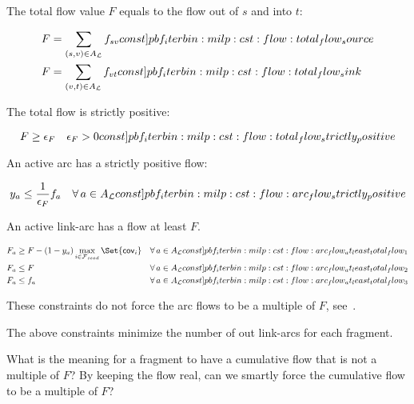 The total flow value \(F\) equals to the flow out of \(s\) and into \(t\):
\begin{Constraint}
  \begin{align}
    F & = \sum_{(s, v) \in A_\Links{}} f_{sv} \cstlabel{pbf_iterbin:milp:cst:flow:total_flow_source} \\ %
    F & = \sum_{(v, t) \in A_\Links{}} f_{vt} \cstlabel{pbf_iterbin:milp:cst:flow:total_flow_sink} %
  \end{align}
\end{Constraint}

The total flow is strictly positive:
\begin{Constraint}
  \begin{equation}
    F \geq \epsilon_F \quad \epsilon_F > 0 \cstlabel{pbf_iterbin:milp:cst:flow:total_flow_strictly_positive} %
  \end{equation}
\end{Constraint}

An active arc has a strictly positive flow:
\begin{Constraint}
  \begin{equation}
    y_a \leq \frac{1}{\epsilon_F} f_a \quad \forall a \in A_\Links{} \cstlabel{pbf_iterbin:milp:cst:flow:arc_flow_strictly_positive} %
  \end{equation}
\end{Constraint}

An active link-arc has a flow at least \(F\).
\begin{Constraint}
  \begin{align}
    F_a & \geq F - (1 - y_a) \max_{i \in \SeedFrags{}}\Set{\cov{i}} & \forall a \in A_\Links{} \cstlabel{pbf_iterbin:milp:cst:flow:arc_flow_at_least_total_flow_1} \\ %
    F_a & \leq F & \forall a \in A_\Links{} \cstlabel{pbf_iterbin:milp:cst:flow:arc_flow_at_least_total_flow_2} \\ %
    F_a & \leq f_a & \forall a \in A_\Links{} \cstlabel{pbf_iterbin:milp:cst:flow:arc_flow_at_least_total_flow_3} %
  \end{align}
\end{Constraint}
\begin{infobox}
  These constraints do not force the arc flows to be a multiple of \(F\), see~.
\end{infobox}
\begin{missingproofbox}
  The above constraints minimize the number of out link-arcs for each fragment.
\end{missingproofbox}
\begin{questionbox}
  What is the meaning for a fragment to have a cumulative flow that is not a multiple of \(F\)?
  By keeping the flow real, can we smartly force the cumulative flow to be a multiple of \(F\)?
\end{questionbox}

